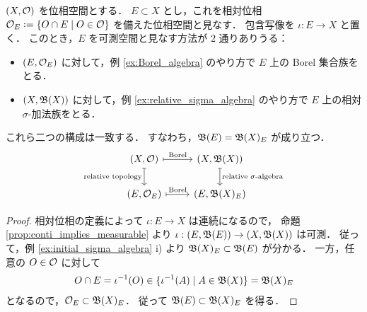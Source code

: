 \begin{proposition}
    $(X,\mathcal{O})$ を位相空間とする．
    $E\subset X$ とし，これを相対位相 $\Ocal_E\defeq\{O\cap E\mid O\in\Ocal\}$ を備えた位相空間と見なす．
    包含写像を $\iota:E\to X$ と置く．
    このとき，$E$ を可測空間と見なす方法が $2$ 通りありうる：
    \begin{itemize}
        \item $(E,\mathcal{O}_E)$ に対して，例 \ref{ex:Borel_algebra} のやり方で $E$ 上の Borel 集合族をとる．
        \item $(X,\mathfrak{B}(X))$ に対して，例 \ref{ex:relative_sigma_algebra} のやり方で $E$ 上の相対 $\sigma$-加法族をとる．
    \end{itemize}
    これら二つの構成は一致する．
    すなわち，$\mathfrak{B}(E)=\mathfrak{B}(X)_E$ が成り立つ．
    \begin{equation*}
        \begin{tikzcd}
            (X,\Ocal)\arrow[r,mapsto,"\text{Borel}"]\arrow[d,mapsto,"\text{relative topology}"']&
            (X,\Bfrak(X))\arrow[d,mapsto,"\text{relative $\sigma$-algebra}"]\\
            (E,\Ocal_E)\arrow[r,mapsto,"\text{Borel}"]&(E,\Bfrak(X)_E)
        \end{tikzcd}
    \end{equation*}
\end{proposition}

\begin{proof}
    相対位相の定義によって $\iota:E\to X$ は連続になるので，
    命題 \ref{prop:conti_implies_measurable} より $\iota:(E,\mathfrak{B}(E))\to(X,\mathfrak{B}(X))$ は可測．
    従って，例 \ref{ex:initial_sigma_algebra} \textrm{i)} より $\mathfrak{B}(X)_E\subset\mathfrak{B}(E)$ が分かる．
    一方，任意の $O\in\mathcal{O}$ に対して
    \begin{align*}
        O\cap E=\iota^{-1}(O)\in\{\iota^{-1}(A)\mid A\in\mathfrak{B}(X)\}=\mathfrak{B}(X)_E
    \end{align*}
    となるので，$\mathcal{O}_E\subset\mathfrak{B}(X)_E$．
    従って $\mathfrak{B}(E)\subset\mathfrak{B}(X)_E$ を得る．
\end{proof}

